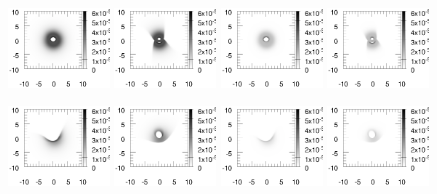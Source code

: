 \documentclass{article}
\begin{document}
\begin{figure}
	\includegraphics[width=0.24\textwidth]{map0Ha3wind306090}
	\includegraphics[width=0.24\textwidth]{map0Ha3wind303060}
	\includegraphics[width=0.24\textwidth]{map0Hb3wind306090}
	\includegraphics[width=0.24\textwidth]{map0Hb3wind303060}
	
	\includegraphics[width=0.24\textwidth]{map1Ha3wind306090}
	\includegraphics[width=0.24\textwidth]{map1Ha3wind303060}
	\includegraphics[width=0.24\textwidth]{map1Hb3wind306090}
	\includegraphics[width=0.24\textwidth]{map1Hb3wind303060}
	

\end{figure}
\end{document}
